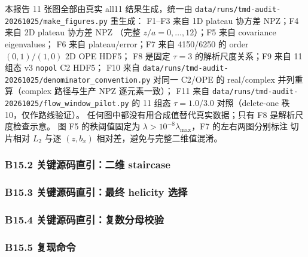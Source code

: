 \documentclass[UTF8]{ctexart}
\newcommand{\pathref}[1]{\texttt{\nolinkurl{#1}}}
\begin{document}
本报告 11 张图全部由真实 all11 结果生成，统一由
\pathref{data/runs/tmd-audit-20261025/make_figures.py} 重生成：
F1--F3 来自 1D plateau 协方差 NPZ；F4 来自 2D plateau 协方差 NPZ
（完整 \(z/a=0,\ldots,12\)）；F5 来自 covariance eigenvalues；
F6 来自 plateau/error；F7 来自 4150/6250 的 order \((0,1)/(1,0)\) 2D OPE HDF5；
F8 是固定 \(\tau=3\) 的解析尺度关系；F9 来自 11 组态 v3 \texttt{nopol} C2 HDF5；
F10 来自 \pathref{data/runs/tmd-audit-20261025/denominator_convention.py} 对同一
C2/OPE 的 real/complex 并列重算（complex 路径与生产 NPZ 逐元素一致）；
F11 来自 \pathref{data/runs/tmd-audit-20261025/flow_window_pilot.py} 的
11 组态 $\tau=1.0/3.0$ 对照（delete-one 秩 10，仅作路线验证）。
任何图中都没有用合成值替代真实数据；只有 F8 是解析尺度检查示意。
图 F5 的秩阈值固定为 \(\lambda>10^{-8}\lambda_{\max}\)，F7 的左右两图分别标注
切片相对 \(L_2\) 与逐 \((z,b_x)\) 相对差，避免与完整二维值混淆。

\subsubsection{B15.2 关键源码直引：二维 staircase}



\subsubsection{B15.3 关键源码直引：最终 helicity 选择}



\subsubsection{B15.4 关键源码直引：复数分母校验}



\subsubsection{B15.5 复现命令}
\end{document}
